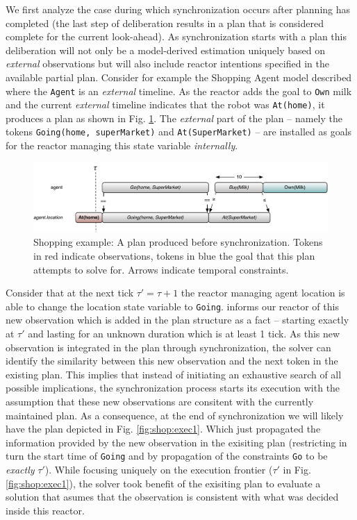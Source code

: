 We first analyze the case during which synchronization occurs after
planning has completed (\ie the last step of deliberation results in a
plan that is considered complete for the current look-ahead). As
synchronization starts with a plan %
this deliberation will not only be a model-derived estimation uniquely
based on {\em external} observations but will also include reactor
intentions specified in the available partial plan. Consider for
example the Shopping Agent model described where the \texttt{Agent} is
an {\em external} timeline. As the reactor adds the goal to
\texttt{Own} milk and the current {\em external} timeline indicates
that the robot was \texttt{At(home)}, it produces a plan as shown in
Fig. \ref{fig:shop:exec0}. The {\em external} part of the plan --
namely the tokens \texttt{Going(home, superMarket)} and
\texttt{At(SuperMarket)} -- are installed as goals for the reactor
managing this state variable {\em internally}.

\begin{figure}[!htb]
  \centering
  \includegraphics[width=0.7\columnwidth]{figs/shoping_exec_t0}
  \caption{\small Shopping example: A plan produced before
    synchronization.  Tokens in red indicate observations, tokens in
    blue the goal that this plan attempts to solve for. Arrows
    indicate temporal constraints.}
  \label{fig:shop:exec0}
\end{figure}

Consider that at the next tick $\tau' = \tau+1$ the reactor managing
agent location is able to change the location state variable to
\texttt{Going}. \rx informs our reactor of this new observation which
is added in the plan structure as a fact -- starting exactly at
$\tau'$ and lasting for an unknown duration which is at least 1
tick. As this new observation is integrated in the plan through
synchronization, the solver can identify the similarity between this
new observation and the next token in the existing plan. This implies
that instead of initiating an exhaustive search of all possible
implications, the synchronization process starts its execution with
the assumption that these new observations are consitent with the
currently maintained plan. As a consequence, at the end of
synchronization we will likely have the plan depicted in
Fig. \ref{fig:shop:exec1}. Which just propagated the information
provided by the new observation in the exisiting plan (restricting in
turn the start time of \texttt{Going} and by propagation of the
constraints \texttt{Go} to be {\em exactly} $\tau'$). While focusing
uniquely on the execution frontier ($\tau'$ in
Fig. \ref{fig:shop:exec1}), the \eu solver took benefit of the
exisiting plan to evaluate a solution that asumes that the observation
is consistent with what was decided inside this reactor.

